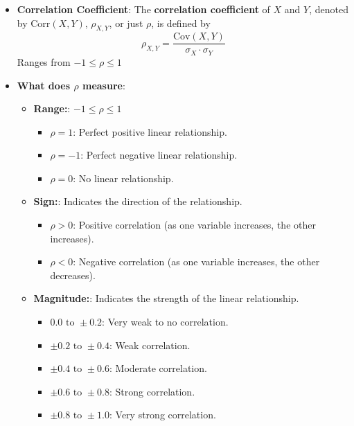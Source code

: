 \documentclass{report}
\begin{document}
\begin{itemize}
        \item \textbf{Correlation Coefficient}:
            The \textbf{correlation coefficient} of \(X\) and \(Y\), denoted by \(\text{Corr}(X, Y)\), \(\rho_{X,Y}\), or just \(\rho\), is defined by
            \[
                \rho_{X,Y} = \frac{\text{Cov}(X, Y)}{\sigma_X \cdot \sigma_Y}
            \]
            Ranges from $-1 \leq \rho \leq 1 $
        \item \textbf{What does $\rho$ measure}:
            \begin{itemize}
                \item \textbf{Range:}: \(-1 \leq \rho \leq 1\)
                    \begin{itemize}
                        \item \(\rho = 1\): Perfect positive linear relationship.
                        \item \(\rho = -1\): Perfect negative linear relationship.
                        \item \(\rho = 0\): No linear relationship.
                    \end{itemize}
                \item \textbf{Sign:}: Indicates the direction of the relationship.
                    \begin{itemize}
                        \item \(\rho > 0\): Positive correlation (as one variable increases, the other increases).
                        \item \(\rho < 0\): Negative correlation (as one variable increases, the other decreases).
                    \end{itemize}
                \item \textbf{Magnitude:}: Indicates the strength of the linear relationship.
                    \begin{itemize}
                        \item \(0.0 \text{ to } \pm 0.2\): Very weak to no correlation.
                        \item \(\pm 0.2 \text{ to } \pm 0.4\): Weak correlation.
                        \item \(\pm 0.4 \text{ to } \pm 0.6\): Moderate correlation.
                        \item \(\pm 0.6 \text{ to } \pm 0.8\): Strong correlation.
                        \item \(\pm 0.8 \text{ to } \pm 1.0\): Very strong correlation.
                    \end{itemize}

\end{itemize}
\end{itemize}
\end{document}
